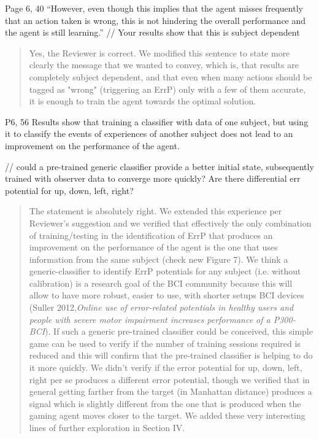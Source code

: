 \documentclass[journal,onecolumn,12pt]{IEEEtran}
\begin{document}
Page 6, 40
“However, even though this implies that the agent misses frequently that an action taken is wrong, this is not hindering the overall performance and the agent is still learning.”
// Your results show that this is subject dependent

\vspace{2em}
\begin{quotation}
{\color{blue}
Yes, the Reviewer is correct.  We modified this sentence to state more clearly the message that we wanted to convey, which is, that results are completely subject dependent, and that even when many actions should be tagged as "wrong" (triggering an ErrP) only with a few of them accurate, it is enough to train the agent towards the optimal solution.
}
\end{quotation}
\vspace{2em}

P6, 56
Results show that training a classifier with data of one subject, but using it
to classify the events of experiences of another subject does
not lead to an improvement on the performance of the agent.

// could a pre-trained generic classifier provide a better initial state, subsequently trained with observer data to converge more quickly?
Are there differential err potential for up, down, left, right?

\vspace{2em}
\begin{quotation}
{\color{blue}
The statement is absolutely right.  We extended this experience per Reviewer's suggestion and we verified that effectively the only combination of training/testing in the identification of ErrP that produces an improvement on the performance of the agent is the one that uses information from the same subject (check new Figure 7).   We think a generic-classifier to identify ErrP potentials for any subject (i.e. without calibration) is a research goal of the BCI community because this will allow to have more robust, easier to use, with shorter setups  BCI devices (Suller 2012,\textit{Online use of error-related potentials in healthy users and people with severe motor impairment increases performance of a P300-BCI}).  If such a generic pre-trained classifier could be conceived, this simple game can be used to verify if the number of training sessions required is reduced and this will confirm that the pre-trained classifier is helping to do it more quickly.  We didn't verify if the error potential for up, down, left, right per se produces a different error potential, though we verified that in general getting farther from the target (in Manhattan distance) produces a signal which is slightly different from the one that is produced when the gaming agent moves closer to the target.  We added these very interesting lines of further exploration in Section IV.
}
\end{quotation}
\vspace{2em}
\end{document}
